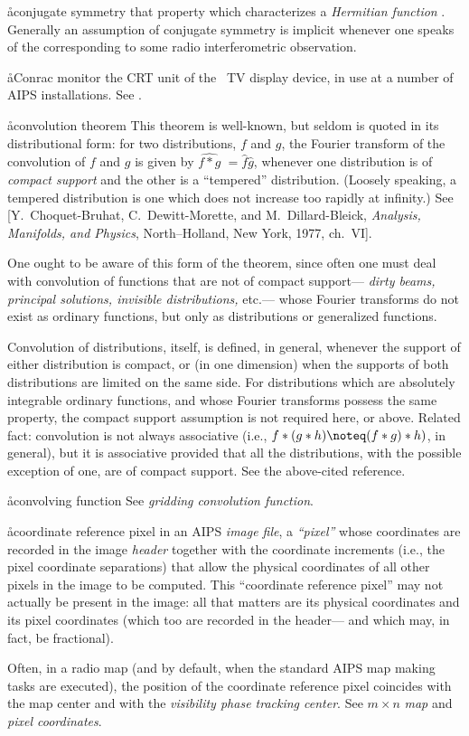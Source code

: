 \aa{conjugate symmetry}
that property which characterizes a {\it Hermitian function} \qv.
Generally an assumption of conjugate symmetry is implicit
whenever one speaks of the 
corresponding to some radio interferometric observation.

\aa{Conrac monitor}
the CRT unit of the \iis\ TV display device, in use at a number
of AIPS installations.
See {\it \iis}.


\aa{convolution theorem}
This theorem is well-known, but seldom is quoted in its distributional
form:  for two distributions, $f$ and $g$, the Fourier transform
of the convolution of $f$ and $g$ is given by
$\widehat{f\ast g} {\phantom{l}}=\hat f\hat g$, whenever one distribution
is of {\it compact support} and the other is a ``tempered'' distribution.
(Loosely speaking, a tempered distribution is one which does not
increase too rapidly at infinity.)
See [Y.~Choquet-Bruhat, C.~Dewitt-Morette, and M.~Dillard-Bleick,
{\it Analysis, Manifolds, and Physics}, North--Holland, New York,
1977, ch.~VI].
\par
One ought to be aware of this
form of the theorem, since often one must deal with convolution
of functions that are not of compact support---%
{\it dirty beams, principal solutions, invisible distributions,} etc.---%
whose Fourier transforms do not exist as ordinary functions,
but only as distributions or generalized functions.
\par
Convolution of distributions, itself, is defined, in general, whenever
the support of either distribution is compact, or (in one
dimension) when the supports of both distributions are limited
on the same side.
For distributions which are absolutely integrable ordinary functions,
and whose Fourier transforms possess the same property,
the compact support assumption is not required here, or above.
Related fact: convolution is not always associative
(i.e., $f\ast(g\ast h) \noteq (f\ast g)\ast h)$, in general),
but it is associative provided that all the distributions, with
the possible exception of one, are of compact support.
See the above-cited reference.

\aa{convolving function} See {\it gridding convolution function}.

\aa{coordinate reference pixel}
in an AIPS {\it image file}, a {\it ``pixel''} whose coordinates are
recorded in the image {\it header} together with the coordinate increments
(i.e., the pixel coordinate separations) that allow the physical
coordinates of all other pixels in the image to be computed.
This ``coordinate reference pixel'' may not actually be present in
the image: all that matters are its physical coordinates and its
pixel coordinates (which too are recorded in the header---%
and which may, in fact, be fractional).
\par
Often, in a radio map (and by default, when the standard AIPS map making
tasks are executed), the position of the coordinate reference pixel
coincides with the map center and with the {\it visibility phase
tracking center}.
See $m\times n$ {\it map} and {\it pixel coordinates}.

